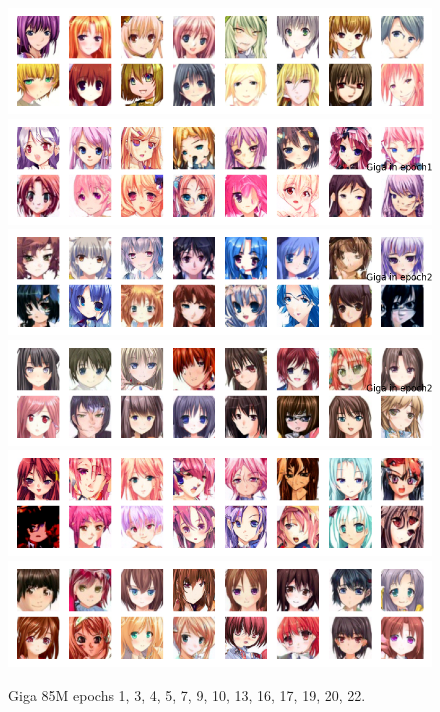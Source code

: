 \documentclass[twocolumn,superscriptaddress,aps]{revtex4-1}
\begin{document}
\begin{figure}[H]
    \includegraphics[width=.32\textwidth]{figures/giga_unet_ddpm_85M_ckpt_epoch_17_with_16_samples.png}
    \includegraphics[width=.32\textwidth]{figures/giga_unet_ddpm_85M_ckpt_epoch_19_epoch_19_samples.png}
    \includegraphics[width=.32\textwidth]{figures/giga_unet_ddpm_85M_ckpt_epoch_20_epoch_20_samples.png}
    \includegraphics[width=.32\textwidth]{figures/giga_unet_ddpm_85M_ckpt_epoch_22_epoch_22_samples.png}
    \includegraphics[width=.32\textwidth]{figures/mega_unet_ddpm_85M_ckpt_epoch_19.png}
    \includegraphics[width=.32\textwidth]{figures/mega_unet_ddpm_85M_ckpt_epoch_22_with_16_samples.png}
    \caption{Giga 85M epochs 1, 3, 4, 5, 7, 9, 10, 13, 16, 17, 19, 20, 22.}
    \label{fig:giga_85m_samples}
\end{figure}
\end{document}
